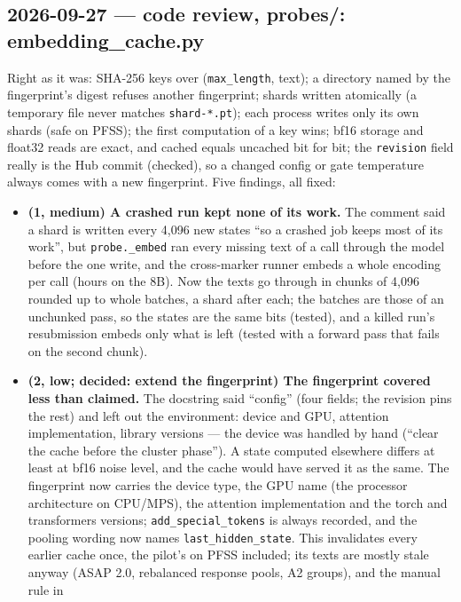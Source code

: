 \documentclass{article}
\begin{document}
\subsection*{2026-09-27 --- code review, probes/: embedding\_cache.py}
Right as it was: SHA-256 keys over (\texttt{max\_length}, text); a directory named by the fingerprint's digest
refuses another fingerprint; shards written atomically (a temporary file never matches \texttt{shard-*.pt});
each process writes only its own shards (safe on PFSS); the first computation of a key wins; bf16 storage and
float32 reads are exact, and cached equals uncached bit for bit; the \texttt{revision} field really is the Hub
commit (checked), so a changed config or gate temperature always comes with a new fingerprint. Five findings,
all fixed:
\begin{itemize}
  \item \textbf{(1, medium) A crashed run kept none of its work.} The comment said a shard is written every
        4{,}096 new states ``so a crashed job keeps most of its work'', but \texttt{probe.\_embed} ran every missing
        text of a call through the model before the one write, and the cross-marker runner embeds a whole
        encoding per call (hours on the 8B). Now the texts go through in chunks of 4{,}096 rounded up to whole
        batches, a shard after each; the batches are those of an unchunked pass, so the states are the same bits
        (tested), and a killed run's resubmission embeds only what is left (tested with a forward pass that fails
        on the second chunk).
  \item \textbf{(2, low; decided: extend the fingerprint) The fingerprint covered less than claimed.} The
        docstring said ``config'' (four fields; the revision pins the rest) and left out the environment:
        device and GPU, attention implementation, library versions --- the device was handled by hand (``clear
        the cache before the cluster phase''). A state computed elsewhere differs at least at bf16 noise level, and
        the cache would have served it as the same. The fingerprint now carries the device type, the GPU name
        (the processor architecture on CPU/MPS), the attention implementation and the torch and transformers
        versions; \texttt{add\_special\_tokens} is always recorded, and the pooling wording now names
        \texttt{last\_hidden\_state}. This invalidates every earlier cache once, the pilot's on PFSS included; its
        texts are mostly stale anyway (ASAP 2.0, rebalanced response pools, A2 groups), and the manual rule in

\end{itemize}
\end{document}
